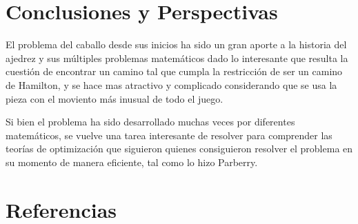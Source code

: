 \documentclass[journal, 10pt]{IEEEtran}
\begin{document}
\section{Conclusiones y Perspectivas}
El problema del caballo desde sus inicios ha sido un gran aporte a la historia del ajedrez y sus m\'ultiples problemas matem\'aticos dado lo interesante que resulta la cuesti\'on de encontrar un camino tal que cumpla la restricci\'on de ser un camino de Hamilton, y se hace mas atractivo y complicado considerando que se usa la pieza con el moviento m\'as inusual de todo el juego. 

Si bien el problema ha sido desarrollado muchas veces por diferentes matemáticos, se vuelve una tarea interesante de resolver para comprender las teorías de optimización que siguieron quienes consiguieron resolver el problema en su momento de manera eficiente, tal como lo hizo Parberry.


\section{Referencias}


\end{document}
